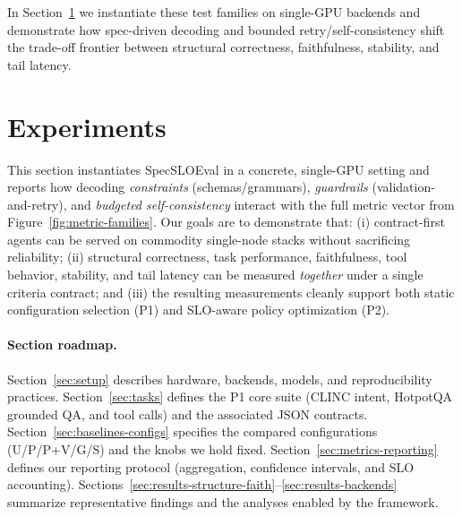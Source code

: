 \documentclass[11pt]{article}
\begin{document}
\medskip
In Section~\ref{sec:experiments} we instantiate these test families on single-GPU backends and demonstrate how spec-driven decoding and bounded retry/self-consistency shift the trade-off frontier between structural correctness, faithfulness, stability, and tail latency.

\section{Experiments}
\label{sec:experiments}

This section instantiates SpecSLOEval in a concrete, single-GPU setting and reports how decoding \emph{constraints} (schemas/grammars), \emph{guardrails} (validation-and-retry), and \emph{budgeted self-consistency} interact with the full metric vector from Figure~\ref{fig:metric-families}.
Our goals are to demonstrate that:
(i) contract-first agents can be served on commodity single-node stacks without sacrificing reliability;
(ii) structural correctness, task performance, faithfulness, tool behavior, stability, and tail latency can be measured \emph{together} under a single criteria contract; and
(iii) the resulting measurements cleanly support both static configuration selection (P1) and SLO-aware policy optimization (P2).

\paragraph{Section roadmap.}
Section~\ref{sec:setup} describes hardware, backends, models, and reproducibility practices.
Section~\ref{sec:tasks} defines the P1 core suite (CLINC intent, HotpotQA grounded QA, and tool calls) and the associated JSON contracts.
Section~\ref{sec:baselines-configs} specifies the compared configurations (U/P/P+V/G/S) and the knobs we hold fixed.
Section~\ref{sec:metrics-reporting} defines our reporting protocol (aggregation, confidence intervals, and SLO accounting).
Sections~\ref{sec:results-structure-faith}--\ref{sec:results-backends} summarize representative findings and the analyses enabled by the framework.
\end{document}
